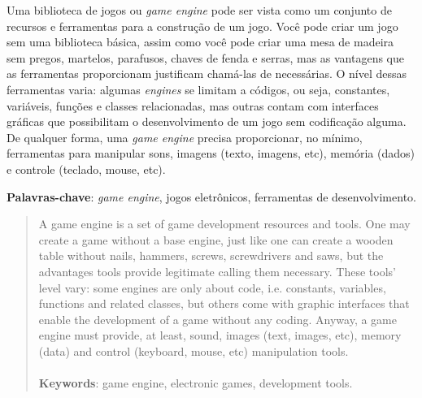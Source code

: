 \begin{resumo}

Uma biblioteca de jogos ou \textit{game engine} pode ser vista como um conjunto de recursos e ferramentas para a construção de um jogo. Você pode criar um jogo sem uma biblioteca básica, assim como você pode criar uma mesa de madeira sem pregos, martelos, parafusos, chaves de fenda e serras, mas as vantagens que as ferramentas proporcionam justificam chamá-las de necessárias.
O nível dessas ferramentas varia: algumas \textit{engines} se limitam a códigos, ou seja, constantes, variáveis, funções e classes relacionadas, mas outras contam com interfaces gráficas que possibilitam o desenvolvimento de um jogo sem codificação alguma. De qualquer forma, uma \textit{game engine} precisa proporcionar, no mínimo, ferramentas para manipular sons, imagens (texto, imagens, etc), memória (dados) e controle (teclado, mouse, etc).

\vspace{1em}
\textbf{Palavras-chave}: \textit{game engine}, jogos eletrônicos, ferramentas de desenvolvimento.
\end{resumo}

\begin{abstract}
%
A game engine is a set of game development resources and tools. One may create a game without a base engine, just like one can create a wooden table without nails, hammers, screws, screwdrivers and saws, but the advantages tools provide legitimate calling them necessary.
These tools’ level vary: some engines are only about code, i.e. constants, variables, functions and related classes, but others come with graphic interfaces that enable the development of a game without any coding. Anyway, a game engine must provide, at least, sound, images (text, images, etc), memory (data) and control (keyboard, mouse, etc) manipulation tools.
%
\\ \\
\vspace{2em}
\textbf{Keywords}: game engine, electronic games, development tools.
\end{abstract}